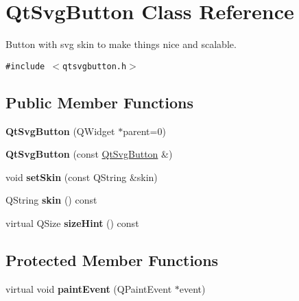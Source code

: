 \hypertarget{classQtSvgButton}{
\section{QtSvgButton Class Reference}
\label{classQtSvgButton}
}
Button with svg skin to make things nice and scalable.  


{\tt \#include $<$qtsvgbutton.h$>$}

\subsection*{Public Member Functions}
\begin{CompactItemize}
\item 
\hypertarget{classQtSvgButton_0d4ef1d4c1a5aaa69ac39590c0c4354b}{
\textbf{QtSvgButton} (QWidget $\ast$parent=0)}
\label{classQtSvgButton_0d4ef1d4c1a5aaa69ac39590c0c4354b}

\item 
\hypertarget{classQtSvgButton_62277720c12b71e84209697d26cd1c23}{
\textbf{QtSvgButton} (const \hyperlink{classQtSvgButton}{QtSvgButton} \&)}
\label{classQtSvgButton_62277720c12b71e84209697d26cd1c23}

\item 
\hypertarget{classQtSvgButton_5c8f52c3df68b010670cdd6f2f55c39f}{
void \textbf{setSkin} (const QString \&skin)}
\label{classQtSvgButton_5c8f52c3df68b010670cdd6f2f55c39f}

\item 
\hypertarget{classQtSvgButton_da17eed3ab131681a0942573d71005df}{
QString \textbf{skin} () const }
\label{classQtSvgButton_da17eed3ab131681a0942573d71005df}

\item 
\hypertarget{classQtSvgButton_918a5cbf1fa074d4287d4dc10607e341}{
virtual QSize \textbf{sizeHint} () const }
\label{classQtSvgButton_918a5cbf1fa074d4287d4dc10607e341}

\end{CompactItemize}
\subsection*{Protected Member Functions}
\begin{CompactItemize}
\item 
\hypertarget{classQtSvgButton_c06b3e2c58e733855478236f7d5fbb7c}{
virtual void \textbf{paintEvent} (QPaintEvent $\ast$event)}
\label{classQtSvgButton_c06b3e2c58e733855478236f7d5fbb7c}

\end{CompactItemize}
